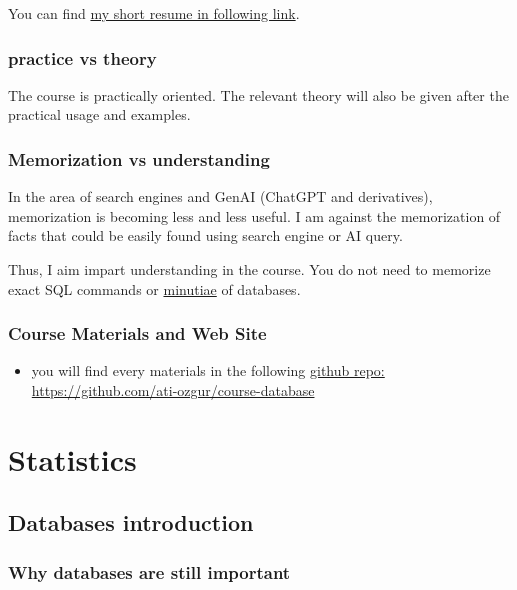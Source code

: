 \documentclass[
  letterpaper,
  DIV=11,
  numbers=noendperiod]{scrreprt}
\providecommand{\tightlist}{%
  \setlength{\itemsep}{0pt}\setlength{\parskip}{0pt}}\usepackage{longtable,booktabs,array}
\begin{document}
You can find \href{https://ati-ozgur.github.io/resume-en.html}{my short
resume in following link}.

\section{practice vs theory}\label{practice-vs-theory}

The course is practically oriented. The relevant theory will also be
given after the practical usage and examples.

\section{Memorization vs
understanding}\label{memorization-vs-understanding}

In the area of search engines and GenAI (ChatGPT and derivatives),
memorization is becoming less and less useful. I am against the
memorization of facts that could be easily found using search engine or
AI query.

Thus, I aim impart understanding in the course. You do not need to
memorize exact SQL commands or
\href{https://www.dictionary.com/browse/minutiae}{minutiae} of
databases.

\section{Course Materials and Web
Site}\label{course-materials-and-web-site}

\begin{itemize}
\tightlist
\item
  you will find every materials in the following
  \href{https://github.com/ati-ozgur/course-database}{github repo:
  https://github.com/ati-ozgur/course-database}
\end{itemize}

\part{Statistics}

\chapter{Databases introduction}\label{databases-introduction}

\section{Why databases are still
important}\label{why-databases-are-still-important}
\end{document}

